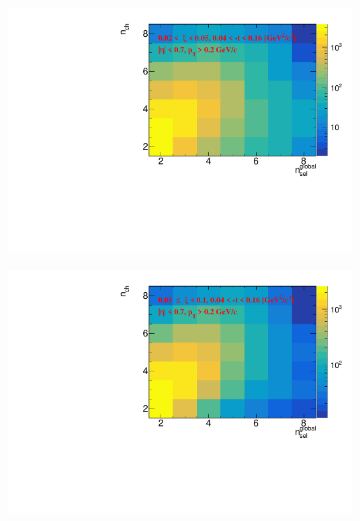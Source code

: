 \begin{figure}[h!]
	\vspace{-0.5cm}
	\centering
	\begin{subfigure}{.49\textwidth}
		\includegraphics[width=\textwidth,page=1]{chapters/chrgSTAR/img/unfolding/matrix_0.pdf}
	\end{subfigure}
	\begin{subfigure}{.49\textwidth}
		\includegraphics[width=\textwidth,page=1]{chapters/chrgSTAR/img/unfolding/matrix_1.pdf}
	\end{subfigure}
	\begin{subfigure}{.49\textwidth}

\end{subfigure}
\end{figure}
